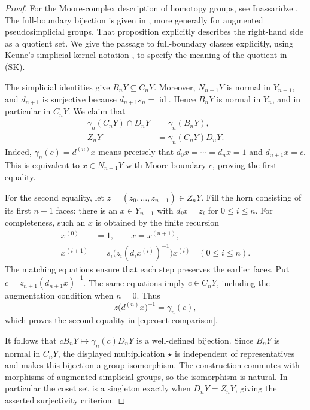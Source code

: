 \documentclass[11pt,a4paper]{article}
\theoremstyle{definition}
\newcommand{\id}{\operatorname{id}}
\begin{document}
\begin{proof}
For the Moore-complex description of homotopy groups, see
Inassaridze \cite[Chapter~2, pp.~35--36, Definition~2.2]{Inassaridze}.
The full-boundary bijection is given in
\cite[Chapter~2, Proposition~2.14, pp.~41--42]{Inassaridze}, more
generally for augmented pseudosimplicial groups. That proposition
explicitly describes the right-hand side as a quotient set.
We give the passage to full-boundary classes explicitly, using Keune's
simplicial-kernel notation \cite{Keune}, to specify the meaning of the
quotient in \textup{(SK)}.

The simplicial identities give $B_nY\subseteq C_nY$.
Moreover, $N_{n+1}Y$ is normal in $Y_{n+1}$, and $d_{n+1}$ is
surjective because $d_{n+1}s_n=\id$. Hence $B_nY$ is normal in
$Y_n$, and in particular in $C_nY$.
We claim that
\begin{equation}\label{eq:coset-comparison}
 \begin{aligned}
 \gamma_n(C_nY)\cap D_nY&=\gamma_n(B_nY),\\
 Z_nY&=\gamma_n(C_nY)D_nY.
 \end{aligned}
\end{equation}
Indeed, $\gamma_n(c)=d^{(n)}x$ means precisely that
$d_0x=\cdots=d_nx=1$ and $d_{n+1}x=c$. This is equivalent to
$x\in N_{n+1}Y$ with Moore boundary $c$, proving the first equality.

For the second equality, let $z=(z_0,\ldots,z_{n+1})\in Z_nY$.
Fill the horn consisting of its first $n+1$ faces: there is an
$x\in Y_{n+1}$ with $d_ix=z_i$ for $0\leq i\leq n$.
For completeness, such an $x$ is obtained by the finite recursion
\[
 \begin{aligned}
 x^{(0)}&=1,\qquad x=x^{(n+1)},\\
 x^{(i+1)}&=s_i\bigl(z_i(d_ix^{(i)})^{-1}\bigr)x^{(i)}
 \quad(0\leq i\leq n).
 \end{aligned}
\]
The matching equations ensure that each step preserves the earlier
faces. Put $c=z_{n+1}(d_{n+1}x)^{-1}$. The same equations imply
$c\in C_nY$, including the augmentation condition when $n=0$.
Thus
\[
 z\bigl(d^{(n)}x\bigr)^{-1}=\gamma_n(c),
\]
which proves the second equality in \eqref{eq:coset-comparison}.

It follows that $cB_nY\mapsto\gamma_n(c)D_nY$ is a well-defined
bijection. Since $B_nY$ is normal in $C_nY$, the displayed
multiplication $\star$ is independent of representatives and makes
this bijection a group isomorphism. The construction commutes with
morphisms of augmented simplicial groups, so the isomorphism is
natural. In particular the coset set is a singleton exactly when
$D_nY=Z_nY$, giving the asserted surjectivity criterion.


\end{proof}
\end{document}

